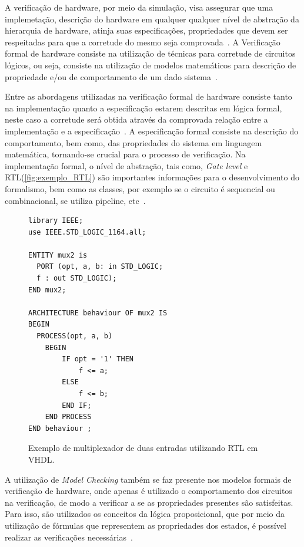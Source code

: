 A verificação de hardware, por meio da simulação, visa assegurar que uma implemetação, descrição do hardware em qualquer qualquer nível de abstração da hierarquia de hardware, atinja suas especificações, propriedades que devem ser respeitadas para que a corretude do mesmo seja comprovada~\cite{gupta1992formal}. A Verificação formal de hardware consiste na utilização 
de técnicas para corretude de circuitos lógicos, ou seja, consiste na utilização de modelos matemáticos para descrição de propriedade e/ou de comportamento de um dado sistema~\cite{kropf2013introduction}.

\par
Entre as abordagens utilizadas na verificação formal de hardware consiste tanto na implementação quanto a especificação estarem descritas em lógica formal, neste caso a corretude será obtida através da comprovada relação entre a implementação e a especificação~\cite{seger1992introduction}. A especificação formal consiste na descrição do comportamento, bem como, das propriedades do sistema em linguagem matemática, tornando-se crucial para o processo de verificação. Na implementação formal, o nível de abstração, tais como, \textit{Gate level} e RTL(\autoref{fig:exemplo_RTL}) são importantes informações para o desenvolvimento do formalismo, bem como as classes, por exemplo se o circuito é sequencial ou combinacional, se utiliza pipeline, etc~\cite{kropf2013introduction}.

\begin{figure}[!htp]
\caption{\label{fig:exemplo_RTL} Exemplo de multiplexador de duas entradas utilizando RTL em VHDL.}
	\begin{center}
    \begin{minipage}{0.7\textwidth}
    \begin{lstlisting}       
library IEEE;
use IEEE.STD_LOGIC_1164.all;

ENTITY mux2 is
  PORT (opt, a, b: in STD_LOGIC;
  f : out STD_LOGIC);
END mux2;

ARCHITECTURE behaviour OF mux2 IS
BEGIN
  PROCESS(opt, a, b)
    BEGIN
        IF opt = '1' THEN
            f <= a;
        ELSE
            f <= b;
        END IF;
    END PROCESS
END behaviour ; 
\end{lstlisting}
    \end{minipage}
	\end{center}
\end{figure}
\par
A utilização de \textit{Model Checking} também se faz presente nos modelos formais de verificação de hardware, onde apenas é utilizado o comportamento dos circuitos na verificação, de modo a verificar a se as propriedades  presentes são satisfeitas. Para isso, são utilizados os conceitos da lógica proposicional, que por meio da utilização de fórmulas que representem as propriedades dos estados, é possível realizar as verificações necessárias~\cite{seger1992introduction}.


